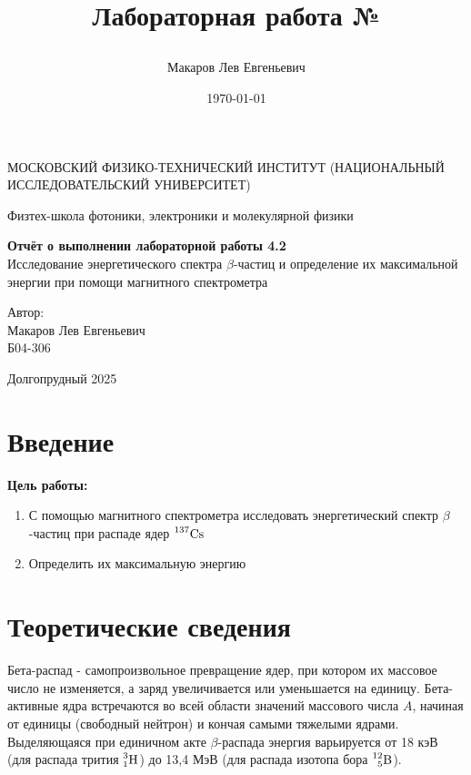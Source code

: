 \documentclass[a4paper,12pt]{article}
\author{Макаров Лев Евгеньевич}
\title{Лабораторная работа №\labnumber

\labname
}
\date{\today}
\newcommand\labname{Исследование энергетического спектра $\beta$-частиц и определение их максимальной энергии при помощи магнитного спектрометра}
\newcommand\labnumber{4.2}
\begin{document}
\begin{titlepage}
	\begin{center}
		{\large МОСКОВСКИЙ ФИЗИКО-ТЕХНИЧЕСКИЙ ИНСТИТУТ (НАЦИОНАЛЬНЫЙ ИССЛЕДОВАТЕЛЬСКИЙ УНИВЕРСИТЕТ)}
	\end{center}
	\begin{center}
		{\large Физтех-школа фотоники, электроники и молекулярной физики}
	\end{center}
	
	
	\vspace{4.5cm}
	{\huge
		\begin{center}
			{\bf Отчёт о выполнении лабораторной работы \labnumber}\\
			\labname
		\end{center}
	}
	\vspace{2cm}
	\begin{flushright}
		{\LARGE Автор:\\ Макаров Лев Евгеньевич \\
			\vspace{0.2cm}
			Б04-306}
	\end{flushright}
	\vspace{8cm}
	\begin{center}
		Долгопрудный 2025
	\end{center}
\end{titlepage}

\section{Введение}

\textbf{Цель работы:} 
\begin{enumerate}
	\item С помощью магнитного спектрометра исследовать энергетический спектр $\beta$-частиц при распаде ядер $\prescript{137}{}{\text{Cs}}$
    \item Определить их максимальную энергию
\end{enumerate}

\section{Теоретические сведения}

Бета-распад - самопроизвольное превращение ядер, при котором их массовое число не изменяется, а заряд увеличивается или уменьшается на единицу. Бета-активные ядра встречаются во всей области значений массового числа $A$, начиная от единицы (свободный нейтрон) и кончая самыми тяжелыми ядрами. Выделяющаяся при единичном акте $\beta$-распада энергия варьируется от 18 кэВ (для распада трития $\prescript{3}{1}{\text{H}}$) до 13,4 МэВ (для распада изотопа бора $\prescript{12}{5}{\text{B}}$).
\end{document}
